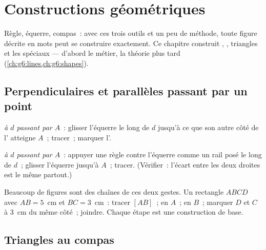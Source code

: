 \chapter{Constructions géométriques}\label{ch:g5:geometry}

Règle, équerre, compas~: avec ces trois outils et un peu de
méthode, toute figure décrite en mots peut se construire
exactement. Ce chapitre construit , ,
triangles et les  spéciaux --- d'abord le métier, la
théorie plus tard (\cref{ch:g6:lines,ch:g6:shapes}).

\section{Perpendiculaires et parallèles passant par un point}

\begin{method}\label{met:g5:geometry:basic}
\emph{ à $d$ passant par $A$}~: glisser l'équerre le
long de $d$ jusqu'à ce que son autre côté de l' atteigne
$A$~; tracer~; marquer l'.

\emph{ à $d$ passant par $A$}~: appuyer une règle contre
l'équerre comme un rail posé le long de $d$~; glisser l'équerre
jusqu'à $A$~; tracer. (Vérifier~: l'écart entre les deux droites est
le même partout.)
\end{method}

\begin{example}\label{ex:g5:geometry:chain}
Beaucoup de figures sont des chaînes de ces deux gestes. Un
rectangle $ABCD$ avec $AB = 5$~cm et $BC = 3$~cm~: tracer $[AB]$~;
 en $A$~;  en $B$~; marquer $D$ et
$C$ à $3$~cm du même côté~; joindre. Chaque étape est une
construction de base.
\end{example}

\section{Triangles au compas}

